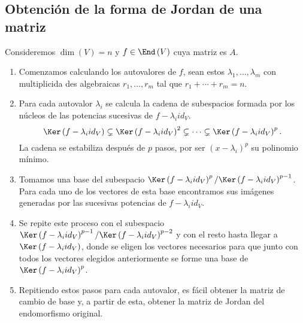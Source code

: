 \subsection*{Obtención de la forma de Jordan de una matriz}
Consideremos $\displaystyle \dim\left(V\right) = n $ y $\displaystyle f \in \End\left(V\right) $ cuya matriz es $\displaystyle A $.
\begin{enumerate}
\item Comenzamos calculando los autovalores de $\displaystyle f $, sean estos $\displaystyle \lambda_{1}, \ldots, \lambda_{m} $ con multiplicida des algebraicas $\displaystyle r_{1}, \ldots, r_{m} $ tal que $\displaystyle r_{1} + \cdots + r_{m} = n $. 
\item Para cada autovalor $\displaystyle \lambda_{i} $ se calcula la cadena de subespacios formada por los núcleos de las potencias sucesivas de $\displaystyle f - \lambda_{i}id _{V} $. 
	\[\Ker\left(f - \lambda_{i}id _{V}\right) \subsetneq \Ker\left(f - \lambda_{i}id _{V}\right)^{2} \subsetneq \cdots \subsetneq \Ker\left(f - \lambda_{i}id _{V}\right)^{p} .\]
	La cadena se estabiliza después de $\displaystyle p $ pasos, por ser $\displaystyle \left(x - \lambda_{i}\right)^{p} $ su polinomio mínimo. 
\item Tomamos una base del subespacio $\displaystyle \Ker\left(f - \lambda_{i}id _{V}\right)^{p} / \Ker\left(f - \lambda_{i}id _{V}\right)^{p-1} $. Para cada uno de los vectores de esta base encontramos sus imágenes generadas por las sucesivas potencias de $\displaystyle f - \lambda_{i}id _{V} $.
\item Se repite este proceso con el subespacio $\displaystyle \Ker\left(f - \lambda_{i}id _{V}\right)^{p-1}/\Ker\left(f - \lambda_{i}id _{V}\right)^{p-2} $ y con el resto hasta llegar a $\displaystyle \Ker\left(f - \lambda_{i}id _{V}\right) $, donde se eligen los vectores necesarios para que junto con todos los vectores elegidos anteriormente se forme una base de $\displaystyle \Ker\left(f - \lambda_{i}id _{V}\right)^{p} $.
\item Repitiendo estos pasos para cada autovalor, es fácil obtener la matriz de cambio de base y, a partir de esta, obtener la matriz de Jordan del endomorfismo original.
\end{enumerate}
